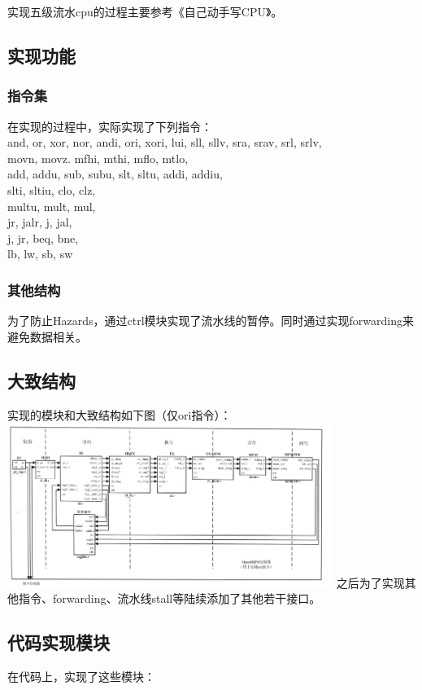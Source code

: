 实现五级流水cpu的过程主要参考《自己动手写CPU》\cite{book}。
\subsection{实现功能}
\subsubsection{指令集}
在实现的过程中，实际实现了下列指令：　\\
and, or, xor, nor, andi, ori, xori, lui, sll, sllv, sra, srav, srl, srlv, \\
movn, movz. mfhi, mthi, mflo, mtlo, \\
add, addu, sub, subu, slt, sltu, addi, addiu, \\
slti, sltiu, clo, clz, \\
multu, mult, mul, \\
jr, jalr, j, jal, \\
j, jr, beq, bne, \\
lb, lw, sb, sw
\subsubsection{其他结构}
为了防止Hazards，通过ctrl模块实现了流水线的暂停。同时通过实现forwarding来避免数据相关。


\subsection{大致结构}
	实现的模块和大致结构如下图（仅ori指令）： \\
	\includegraphics[width = 400]{Picture1.png}
	之后为了实现其他指令、forwarding、流水线stall等陆续添加了其他若干接口。

\subsection{代码实现模块}
	在代码上，实现了这些模块：
